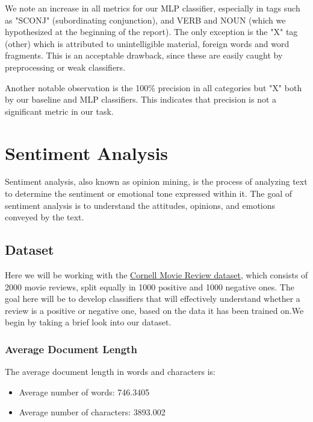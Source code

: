 \documentclass[10pt, a4paper]{article}
\begin{document}
	We note an increase in all metrics for our MLP classifier, especially in tags such as "SCONJ" (subordinating conjunction), and VERB and NOUN (which we hypothesized at the beginning of the report). The only exception is the "X" tag (other) which is attributed to unintelligible material, foreign words and word fragments. This is an acceptable drawback, since these are easily caught by preprocessing or weak classifiers.
	
	Another notable observation is the 100\% precision in all categories but "X" both by our baseline and MLP classifiers. This indicates that precision is not a significant metric in our task.

	
	
	
	
	



     \section{Sentiment Analysis}
        
    Sentiment analysis, also known as opinion mining, is the process of analyzing text to determine the sentiment or emotional tone expressed within it. The goal of sentiment analysis is to understand the attitudes, opinions, and emotions conveyed by the text. 

    \subsection{Dataset}
    Here we will be working with the \href{http://www.cs.cornell.edu/people/pabo/movie-review-data/}{Cornell Movie Review dataset}, which consists of 2000 movie reviews, split equally in 1000 positive and 1000 negative ones. The goal here will be to develop classifiers that will effectively understand whether a review is a positive or negative one, based on the data it has been trained on.We begin by taking a brief look into our dataset.
    
    
    \subsubsection{Average Document Length }

    The average document length in words and characters is:
    \begin{itemize}
        \item Average number of words: 746.3405
        \item Average number of characters: 3893.002
    \end{itemize}
\end{document}
